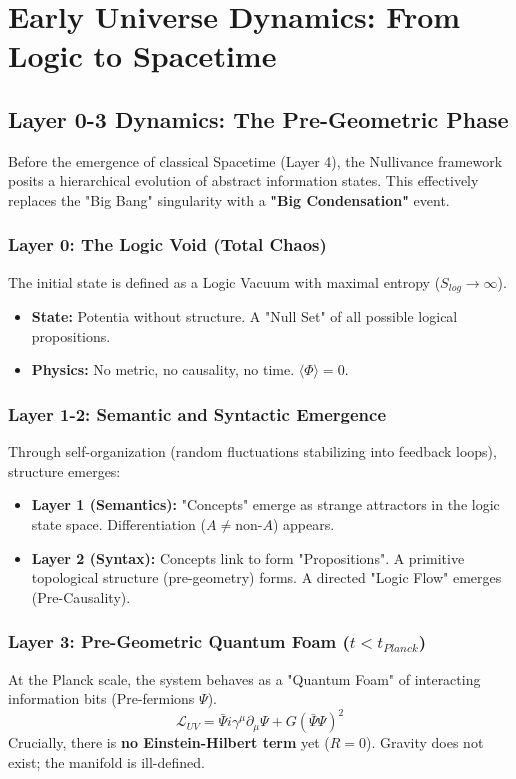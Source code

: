 \documentclass[a4paper,12pt]{article}
\begin{document}
\section{Early Universe Dynamics: From Logic to Spacetime}

\subsection{Layer 0-3 Dynamics: The Pre-Geometric Phase}

Before the emergence of classical Spacetime (Layer 4), the Nullivance framework posits a hierarchical evolution of abstract information states. This effectively replaces the "Big Bang" singularity with a \textbf{"Big Condensation"} event.

\subsubsection{Layer 0: The Logic Void (Total Chaos)}
The initial state is defined as a Logic Vacuum with maximal entropy ($S_{log} \to \infty$).
\begin{itemize}
    \item \textbf{State:} Potentia without structure. A "Null Set" of all possible logical propositions.
    \item \textbf{Physics:} No metric, no causality, no time. $\langle \Phi \rangle = 0$.
\end{itemize}

\subsubsection{Layer 1-2: Semantic and Syntactic Emergence}
Through self-organization (random fluctuations stabilizing into feedback loops), structure emerges:
\begin{itemize}
    \item \textbf{Layer 1 (Semantics):} "Concepts" emerge as strange attractors in the logic state space. Differentiation ($A \neq \text{non-}A$) appears.
    \item \textbf{Layer 2 (Syntax):} Concepts link to form "Propositions". A primitive topological structure (pre-geometry) forms. A directed "Logic Flow" emerges (Pre-Causality).
\end{itemize}

\subsubsection{Layer 3: Pre-Geometric Quantum Foam ($t < t_{Planck}$)}
At the Planck scale, the system behaves as a "Quantum Foam" of interacting information bits (Pre-fermions $\Psi$).
\begin{equation}
    \mathcal{L}_{UV} = \bar{\Psi} i \gamma^\mu \partial_\mu \Psi + G (\bar{\Psi} \Psi)^2
\end{equation}
Crucially, there is \textbf{no Einstein-Hilbert term} yet ($R=0$). Gravity does not exist; the manifold is ill-defined.
\end{document}
